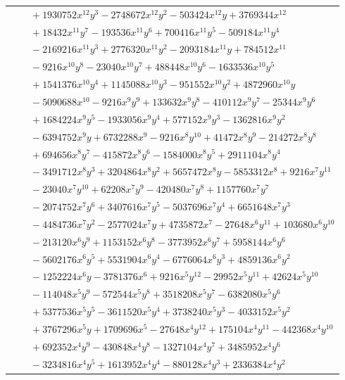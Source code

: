 \documentclass[11pt]{article}
\begin{document}
\begin{longtable}{@{}ll@{}}
 & $\quad +1930752x^{12}y^{3}-2748672x^{12}y^{2}-503424x^{12}y+3769344x^{12}$\\
 & $\quad +18432x^{11}y^{7}-193536x^{11}y^{6}+700416x^{11}y^{5}-509184x^{11}y^{4}$\\
 & $\quad -2169216x^{11}y^{3}+2776320x^{11}y^{2}-2093184x^{11}y+784512x^{11}$\\
 & $\quad -9216x^{10}y^{8}-23040x^{10}y^{7}+488448x^{10}y^{6}-1633536x^{10}y^{5}$\\
 & $\quad +1541376x^{10}y^{4}+1145088x^{10}y^{3}-951552x^{10}y^{2}+4872960x^{10}y$\\
 & $\quad -5090688x^{10}-9216x^{9}y^{9}+133632x^{9}y^{8}-410112x^{9}y^{7}-25344x^{9}y^{6}$\\
 & $\quad +1684224x^{9}y^{5}-1933056x^{9}y^{4}+577152x^{9}y^{3}-1362816x^{9}y^{2}$\\
 & $\quad -6394752x^{9}y+6732288x^{9}-9216x^{8}y^{10}+41472x^{8}y^{9}-214272x^{8}y^{8}$\\
 & $\quad +694656x^{8}y^{7}-415872x^{8}y^{6}-1584000x^{8}y^{5}+2911104x^{8}y^{4}$\\
 & $\quad -3491712x^{8}y^{3}+3204864x^{8}y^{2}+5657472x^{8}y-5853312x^{8}+9216x^{7}y^{11}$\\
 & $\quad -23040x^{7}y^{10}+62208x^{7}y^{9}-420480x^{7}y^{8}+1157760x^{7}y^{7}$\\
 & $\quad -2074752x^{7}y^{6}+3407616x^{7}y^{5}-5037696x^{7}y^{4}+6651648x^{7}y^{3}$\\
 & $\quad -4484736x^{7}y^{2}-2577024x^{7}y+4735872x^{7}-27648x^{6}y^{11}+103680x^{6}y^{10}$\\
 & $\quad -213120x^{6}y^{9}+1153152x^{6}y^{8}-3773952x^{6}y^{7}+5958144x^{6}y^{6}$\\
 & $\quad -5602176x^{6}y^{5}+5531904x^{6}y^{4}-6776064x^{6}y^{3}+4859136x^{6}y^{2}$\\
 & $\quad -1252224x^{6}y-3781376x^{6}+9216x^{5}y^{12}-29952x^{5}y^{11}+42624x^{5}y^{10}$\\
 & $\quad -114048x^{5}y^{9}-572544x^{5}y^{8}+3518208x^{5}y^{7}-6382080x^{5}y^{6}$\\
 & $\quad +5377536x^{5}y^{5}-3611520x^{5}y^{4}+3738240x^{5}y^{3}-4033152x^{5}y^{2}$\\
 & $\quad +3767296x^{5}y+1709696x^{5}-27648x^{4}y^{12}+175104x^{4}y^{11}-442368x^{4}y^{10}$\\
 & $\quad +692352x^{4}y^{9}-430848x^{4}y^{8}-1327104x^{4}y^{7}+3485952x^{4}y^{6}$\\
 & $\quad -3234816x^{4}y^{5}+1613952x^{4}y^{4}-880128x^{4}y^{3}+2336384x^{4}y^{2}$\\

\end{longtable}
\end{document}
